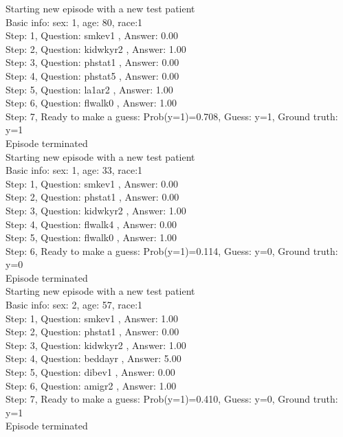 \documentclass[reqno,11pt]{article}
\begin{document}
\noindent Starting new episode with a new test patient \\ [0.5ex] 
Basic info: sex: 1, age: 80, race:1 \\ [0.5ex] 
Step: 1, Question:  smkev1 , Answer: 0.00 \\ [0.5ex] 
Step: 2, Question:  kidwkyr2 , Answer: 1.00 \\ [0.5ex] 
Step: 3, Question:  phstat1 , Answer: 0.00 \\ [0.5ex] 
Step: 4, Question:  phstat5 , Answer: 0.00 \\ [0.5ex] 
Step: 5, Question:  la1ar2 , Answer: 1.00 \\ [0.5ex] 
Step: 6, Question:  flwalk0 , Answer: 1.00 \\ [0.5ex] 
Step: 7, Ready to make a guess: Prob(y=1)=0.708, Guess: y=1, Ground truth: y=1 \\ [0.5ex] 
Episode terminated \\ [0.5ex] 

\noindent Starting new episode with a new test patient \\ [0.5ex] 
Basic info: sex: 1, age: 33, race:1 \\ [0.5ex] 
Step: 1, Question:  smkev1 , Answer: 0.00 \\ [0.5ex] 
Step: 2, Question:  phstat1 , Answer: 0.00 \\ [0.5ex] 
Step: 3, Question:  kidwkyr2 , Answer: 1.00 \\ [0.5ex] 
Step: 4, Question:  flwalk4 , Answer: 0.00 \\ [0.5ex] 
Step: 5, Question:  flwalk0 , Answer: 1.00 \\ [0.5ex] 
Step: 6, Ready to make a guess: Prob(y=1)=0.114, Guess: y=0, Ground truth: y=0 \\ [0.5ex] 
Episode terminated \\ [0.5ex] 

\noindent Starting new episode with a new test patient \\ [0.5ex] 
Basic info: sex: 2, age: 57, race:1 \\ [0.5ex] 
Step: 1, Question:  smkev1 , Answer: 1.00 \\ [0.5ex] 
Step: 2, Question:  phstat1 , Answer: 0.00 \\ [0.5ex] 
Step: 3, Question:  kidwkyr2 , Answer: 1.00 \\ [0.5ex] 
Step: 4, Question:  beddayr , Answer: 5.00 \\ [0.5ex] 
Step: 5, Question:  dibev1 , Answer: 0.00 \\ [0.5ex] 
Step: 6, Question:  amigr2 , Answer: 1.00 \\ [0.5ex] 
Step: 7, Ready to make a guess: Prob(y=1)=0.410, Guess: y=0, Ground truth: y=1 \\ [0.5ex] 
Episode terminated \\ [0.5ex] 
\end{document}
